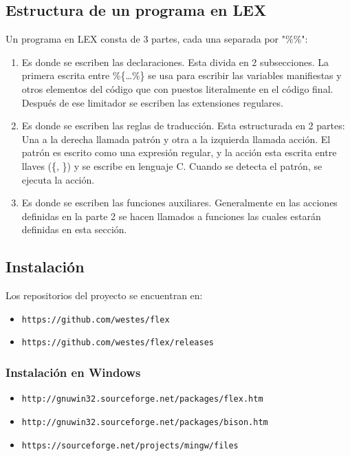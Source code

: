 \subsection{Estructura de un programa en LEX}

Un programa en LEX consta de 3 partes, cada una separada por "\%\%":
\begin{enumerate}
    \item Es donde se escriben las declaraciones. Esta divida en 2 subsecciones. La primera escrita entre \%\{\dots\%\} se usa para escribir las variables manifiestas y otros elementos del código que con puestos literalmente en el código final. Después de ese limitador se escriben las extensiones regulares.
    \item Es donde se escriben las reglas de traducción. Esta estructurada en 2 partes: Una a la derecha llamada patrón y otra a la izquierda llamada acción. El patrón es escrito como una expresión regular, y la acción esta escrita entre llaves (\{, \}) y se escribe en lenguaje C. Cuando se detecta el patrón, se ejecuta la acción.
    \item Es donde se escriben las funciones auxiliares. Generalmente en las acciones definidas en la parte 2 se hacen llamados a funciones las cuales estarán definidas en esta sección.
\end{enumerate}

\subsection{Instalación}

Los repositorios del proyecto se encuentran en:
\begin{itemize}
    \item \verb|https://github.com/westes/flex|
    \item \verb|https://github.com/westes/flex/releases|
\end{itemize}

\subsubsection{Instalación en Windows}
\begin{itemize}
    \item \verb|http://gnuwin32.sourceforge.net/packages/flex.htm|
    \item \verb|http://gnuwin32.sourceforge.net/packages/bison.htm|
    \item \verb|https://sourceforge.net/projects/mingw/files|
\end{itemize}

